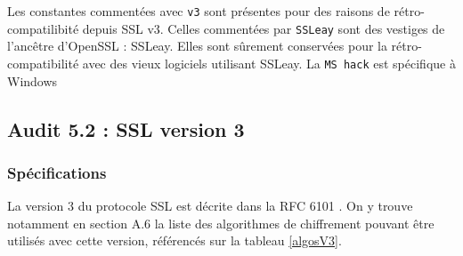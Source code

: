 Les constantes commentées avec \verb+v3+ sont présentes pour des raisons de rétro-compatilibité depuis SSL v3. Celles commentées par \verb+SSLeay+ sont des vestiges de l'ancêtre d'OpenSSL : SSLeay. Elles sont sûrement conservées pour la rétro-compatibilité avec des vieux logiciels utilisant SSLeay. La \verb+MS hack+ est spécifique à Windows


\subsection{Audit 5.2 : SSL version 3}
\subsubsection{Spécifications}
La version 3 du protocole SSL est décrite dans la RFC 6101 \cite{rfc6101}. On y trouve notamment en section A.6 la liste des algorithmes de chiffrement pouvant être utilisés avec cette version, référencés sur la tableau \ref{algosV3}.

